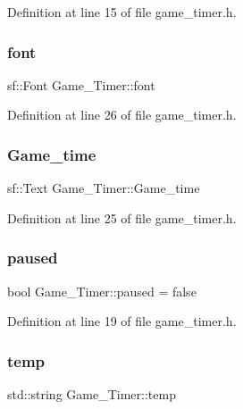 Definition at line 15 of file game\+\_\+timer.\+h.

\hypertarget{class_game___timer_a4d3db3baba86f24e5b69fc462d48868c}{}\label{class_game___timer_a4d3db3baba86f24e5b69fc462d48868c} 
\subsubsection{\texorpdfstring{font}{font}}
{\footnotesize\ttfamily sf\+::\+Font Game\+\_\+\+Timer\+::font}



Definition at line 26 of file game\+\_\+timer.\+h.

\hypertarget{class_game___timer_a220c82c41741426a03ce27b0d5bf4cdd}{}\label{class_game___timer_a220c82c41741426a03ce27b0d5bf4cdd} 
\subsubsection{\texorpdfstring{Game\+\_\+time}{Game\_time}}
{\footnotesize\ttfamily sf\+::\+Text Game\+\_\+\+Timer\+::\+Game\+\_\+time}



Definition at line 25 of file game\+\_\+timer.\+h.

\hypertarget{class_game___timer_a8b0bfed6b2c70a9ab14398b6afcc1f16}{}\label{class_game___timer_a8b0bfed6b2c70a9ab14398b6afcc1f16} 
\subsubsection{\texorpdfstring{paused}{paused}}
{\footnotesize\ttfamily bool Game\+\_\+\+Timer\+::paused = false\hspace{0.3cm}{\ttfamily [protected]}}



Definition at line 19 of file game\+\_\+timer.\+h.

\hypertarget{class_game___timer_ac18cf859f9839cf7b21b733125c3bdb6}{}\label{class_game___timer_ac18cf859f9839cf7b21b733125c3bdb6} 
\subsubsection{\texorpdfstring{temp}{temp}}
{\footnotesize\ttfamily std\+::string Game\+\_\+\+Timer\+::temp\hspace{0.3cm}{\ttfamily [protected]}}




